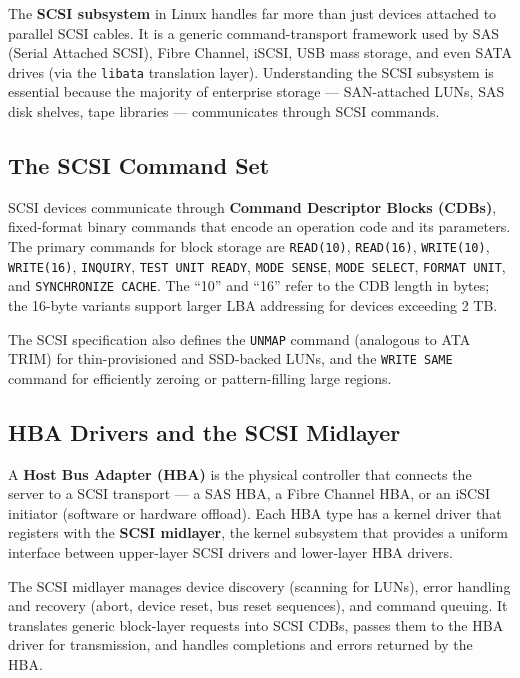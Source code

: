 The \textbf{SCSI subsystem} in Linux handles far more than just devices attached to parallel SCSI cables. It is a generic command-transport framework used by SAS (Serial Attached SCSI), Fibre Channel, iSCSI, USB mass storage, and even SATA drives (via the \texttt{libata} translation layer). Understanding the SCSI subsystem is essential because the majority of enterprise storage --- SAN-attached LUNs, SAS disk shelves, tape libraries --- communicates through SCSI commands.

\subsection{The SCSI Command Set}

SCSI devices communicate through \textbf{Command Descriptor Blocks (CDBs)}, fixed-format binary commands that encode an operation code and its parameters. The primary commands for block storage are \texttt{READ(10)}, \texttt{READ(16)}, \texttt{WRITE(10)}, \texttt{WRITE(16)}, \texttt{INQUIRY}, \texttt{TEST UNIT READY}, \texttt{MODE SENSE}, \texttt{MODE SELECT}, \texttt{FORMAT UNIT}, and \texttt{SYNCHRONIZE CACHE}. The ``10'' and ``16'' refer to the CDB length in bytes; the 16-byte variants support larger LBA addressing for devices exceeding 2 TB.

The SCSI specification also defines the \texttt{UNMAP} command (analogous to ATA TRIM) for thin-provisioned and SSD-backed LUNs, and the \texttt{WRITE SAME} command for efficiently zeroing or pattern-filling large regions.

\subsection{HBA Drivers and the SCSI Midlayer}

A \textbf{Host Bus Adapter (HBA)} is the physical controller that connects the server to a SCSI transport --- a SAS HBA, a Fibre Channel HBA, or an iSCSI initiator (software or hardware offload). Each HBA type has a kernel driver that registers with the \textbf{SCSI midlayer}, the kernel subsystem that provides a uniform interface between upper-layer SCSI drivers and lower-layer HBA drivers.

The SCSI midlayer manages device discovery (scanning for LUNs), error handling and recovery (abort, device reset, bus reset sequences), and command queuing. It translates generic block-layer requests into SCSI CDBs, passes them to the HBA driver for transmission, and handles completions and errors returned by the HBA.

